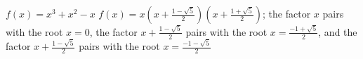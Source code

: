 {$f(x)=x^3+x^2 -x$}
{$f(x) = x(x+ \frac{1-\sqrt{5}}{2})(x+\frac{1+\sqrt{5}}{2})$; the factor $x$ pairs with the root $x=0$, the factor $x + \frac{1-\sqrt{5}}{2}$ pairs with the root $x=\frac{-1+\sqrt{5}}{2}$, and  the factor $x+\frac{1-\sqrt{5}}{2}$ pairs with the root $x=\frac{-1-\sqrt{5}}{2}$}
